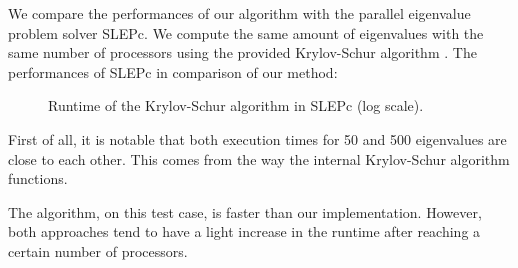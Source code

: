 We compare the performances of our algorithm with the parallel eigenvalue problem solver SLEPc.
We compute the same amount of eigenvalues with the same number of processors using the provided Krylov-Schur algorithm \cite{stewart_krylovschur_2002}.
The performances of SLEPc in comparison of our method:

\begin{figure}[H]
  \centering
  
  \caption{Runtime of the Krylov-Schur algorithm in SLEPc (log scale).}
\end{figure}

First of all, it is notable that both execution times for 50 and 500 eigenvalues are close to each other.
This comes from the way the internal Krylov-Schur algorithm functions.

The algorithm, on this test case, is faster than our implementation.
However, both approaches tend to have a light increase in the runtime after reaching a certain number of processors.
